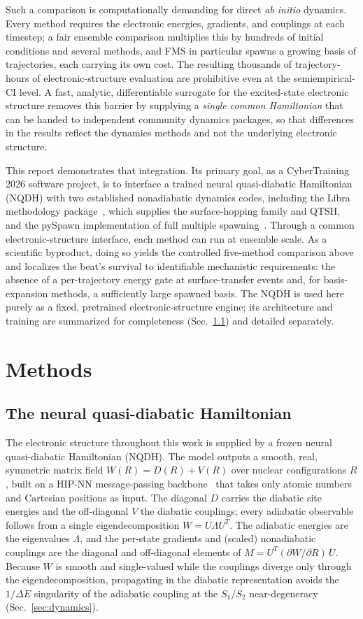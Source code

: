 \documentclass[11pt]{article}
\begin{document}
Such a comparison is computationally demanding for direct \emph{ab initio} dynamics. Every method requires the electronic energies, gradients, and couplings at each timestep; a fair ensemble comparison multiplies this by hundreds of initial conditions and several methods, and FMS in particular spawns a growing basis of trajectories, each carrying its own cost. The resulting thousands of trajectory-hours of electronic-structure evaluation are prohibitive even at the semiempirical-CI level. A fast, analytic, differentiable surrogate for the excited-state electronic structure removes this barrier by supplying a \emph{single common Hamiltonian} that can be handed to independent community dynamics packages, so that differences in the results reflect the dynamics methods and not the underlying electronic structure.

This report demonstrates that integration. Its primary goal, as a CyberTraining 2026 software project, is to interface a trained neural quasi-diabatic Hamiltonian (NQDH) with two established nonadiabatic dynamics codes, including the Libra methodology package~\cite{akimov2016libra}, which supplies the surface-hopping family and QTSH, and the pySpawn implementation of full multiple spawning~\cite{fedorov2020pyspawn}. Through a common electronic-structure interface, each method can run at ensemble scale. As a scientific byproduct, doing so yields the controlled five-method comparison above and localizes the beat's survival to identifiable mechanistic requirements: the absence of a per-trajectory energy gate at surface-transfer events and, for basis-expansion methods, a sufficiently large spawned basis. The NQDH is used here purely as a fixed, pretrained electronic-structure engine; its architecture and training are summarized for completeness (Sec.~\ref{sec:nqdh}) and detailed separately.

\section{Methods}
\subsection{The neural quasi-diabatic Hamiltonian}
\label{sec:nqdh}
The electronic structure throughout this work is supplied by a frozen neural quasi-diabatic Hamiltonian (NQDH). The model outputs a smooth, real, symmetric matrix field $W(R) = D(R) + V(R)$ over nuclear configurations $R$, built on a HIP-NN message-passing backbone~\cite{lubbers2018hierarchical} that takes only atomic numbers and Cartesian positions as input. The diagonal $D$ carries the diabatic site energies and the off-diagonal $V$ the diabatic couplings; every adiabatic observable follows from a single eigendecomposition $W = U\Lambda U^{T}$. The adiabatic energies are the eigenvalues $\Lambda$, and the per-state gradients and (scaled) nonadiabatic couplings are the diagonal and off-diagonal elements of $M = U^{T}(\partial W/\partial R)\,U$. Because $W$ is smooth and single-valued while the couplings diverge only through the eigendecomposition, propagating in the diabatic representation avoids the $1/\Delta E$ singularity of the adiabatic coupling at the $S_1/S_2$ near-degeneracy (Sec.~\ref{sec:dynamics}).
\end{document}
